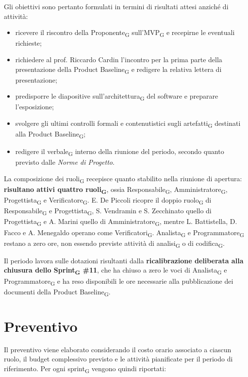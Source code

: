 ﻿\documentclass[a4paper, 10pt, colorlinks=true, linkcolor=black, urlcolor=blue, citecolor=blue, hidelinks]{article}
\begin{document}
Gli obiettivi sono pertanto formulati in termini di risultati attesi anziché di attività:
\begin{itemize}
    \item ricevere il riscontro della Proponente\textsubscript{G} sull'MVP\textsubscript{G} e recepirne le eventuali richieste;

    \item richiedere al prof. Riccardo Cardin l'incontro per la prima parte della presentazione della Product Baseline\textsubscript{G} e redigere la relativa lettera di presentazione;

    \item predisporre le diapositive sull'architettura\textsubscript{G} del software e preparare l'esposizione;

    \item svolgere gli ultimi controlli formali e contenutistici sugli artefatti\textsubscript{G} destinati alla Product Baseline\textsubscript{G};

    \item redigere il verbale\textsubscript{G} interno della riunione del periodo, secondo quanto previsto dalle \textit{Norme di Progetto}.
\end{itemize}

La composizione dei ruoli\textsubscript{G} recepisce quanto stabilito nella riunione di apertura: \textbf{risultano attivi quattro ruoli\textsubscript{G}}, ossia Responsabile\textsubscript{G}, Amministratore\textsubscript{G}, Progettista\textsubscript{G} e Verificatore\textsubscript{G}. E. De Piccoli ricopre il doppio ruolo\textsubscript{G} di Responsabile\textsubscript{G} e Progettista\textsubscript{G}, S. Vendramin e S. Zecchinato quello di Progettista\textsubscript{G} e A. Marini quello di Amministratore\textsubscript{G}, mentre L. Battistella, D. Facco e A. Menegaldo operano come Verificatori\textsubscript{G}. Analista\textsubscript{G} e Programmatore\textsubscript{G} restano a zero ore, non essendo previste attività di analisi\textsubscript{G} o di codifica\textsubscript{G}.

Il periodo lavora sulle dotazioni risultanti dalla \textbf{ricalibrazione deliberata alla chiusura dello Sprint\textsubscript{G} \#11}, che ha chiuso a zero le voci di Analista\textsubscript{G} e Programmatore\textsubscript{G} e ha reso disponibili le ore necessarie alla pubblicazione dei documenti della Product Baseline\textsubscript{G}.

\section{Preventivo}
Il preventivo viene elaborato considerando il costo orario associato a ciascun ruolo, il budget complessivo previsto e le attività pianificate per il periodo di riferimento. Per ogni sprint\textsubscript{G} vengono quindi riportati:
\end{document}
